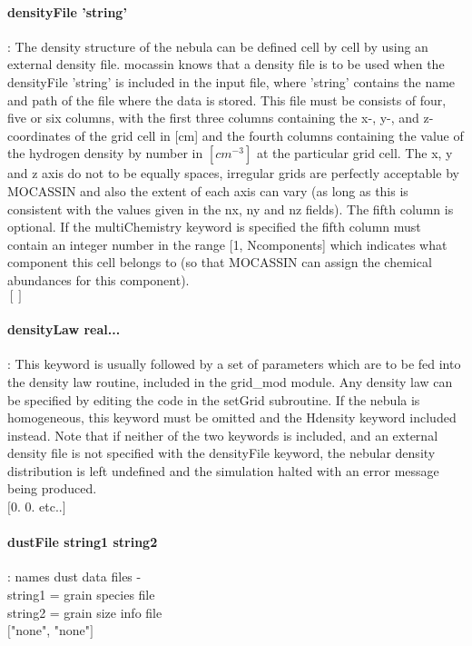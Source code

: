 \documentclass[11pt]{article}
\begin{document}
\paragraph   {densityFile 'string'}: The density structure of the nebula can be defined cell by 
	             cell by using an external density file. {\sc mocassin} knows that a 
		     density file is to be used when the densityFile 'string' is 
		     included in the input file, where 'string' contains the name 
		     and path of the file where the data is stored. This file must 
		     be consists of four, five or six columns, with the first three 
		     columns containing the x-, y-, and z- coordinates of the grid cell in 
		     [cm] and the fourth columns containing the value of the hydrogen 
		     density by number in $[cm^{-3}]$ at the particular grid cell. The 
		     x, y and z axis do not to be equally spaces, irregular grids are 
		     perfectly acceptable by MOCASSIN and also the extent of each axis 
		     can vary (as long as this is consistent with the values given in 
		     the nx, ny and nz fields). The fifth column is optional. If the 
                     multiChemistry keyword is specified the fifth column must contain
                     an integer number in the range [1, Ncomponents] which indicates what 
                     component this cell belongs to (so that MOCASSIN can assign the chemical 
                     abundances for this component).\\
		     $[]$\\

\paragraph    {densityLaw real... }: This keyword is usually followed by a set of 
		     parameters which are to be fed into the density law routine, 
		     included in the grid\_mod module. Any density law can be 
		     specified by editing the code in the setGrid subroutine. 
		     If the nebula is homogeneous, this keyword must be omitted 
		     and the Hdensity keyword included instead. Note that if neither
		     of the two keywords is included, and an external density file 
		     is not specified with the densityFile keyword, the nebular 
		     density distribution is left undefined and the simulation 
		     halted with an error message being produced.\\
		     $[$0. 0. etc..$]$\\
    
\paragraph    {dustFile string1 string2} : names dust data files - \\
                     string1 = grain species file\\
                     string2 = grain size info file\\
		     $[$"none", "none"$]$\\
\end{document}
